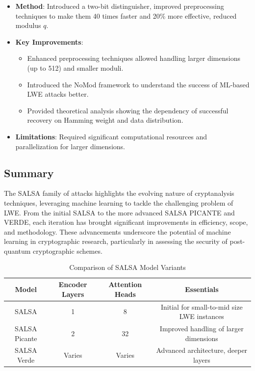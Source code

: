 \documentclass{article}
\begin{document}
\begin{itemize}
\begin{itemize}
        \item \textbf{Method}: Introduced a two-bit distinguisher, improved preprocessing techniques to make them 40 times faster and 20\% more effective, reduced modulus \(q\).
        \item \textbf{Key Improvements}:
        \begin{itemize}
            \item Enhanced preprocessing techniques allowed handling larger dimensions (up to 512) and smaller moduli.
            \item Introduced the NoMod framework to understand the success of ML-based LWE attacks better.
            \item Provided theoretical analysis showing the dependency of successful recovery on Hamming weight and data distribution.
        \end{itemize}
        \item \textbf{Limitations}: Required significant computational resources and parallelization for larger dimensions.
    \end{itemize}
\end{itemize}

\subsection{Summary}

The SALSA family of attacks highlights the evolving nature of cryptanalysis techniques, leveraging machine learning to tackle the challenging problem of LWE. From the initial SALSA to the more advanced SALSA PICANTE and VERDE, each iteration has brought significant improvements in efficiency, scope, and methodology. These advancements underscore the potential of machine learning in cryptographic research, particularly in assessing the security of post-quantum cryptographic schemes.

\begin{table}[h]
    \centering
    \begin{tabular}{|c|c|c|c|}
        \hline
        \textbf{Model} & \textbf{Encoder Layers} & \textbf{Attention Heads} & \textbf{Essentials} \\
        \hline
        SALSA & 1 & 8 & Initial for small-to-mid size LWE instances\\
        SALSA Picante & 2 & 32 & Improved handling of larger dimensions\\
        SALSA Verde & Varies & Varies & Advanced architecture, deeper layers\\
        \hline
    \end{tabular}
    \caption{Comparison of SALSA Model Variants}
\end{table}
\end{document}
